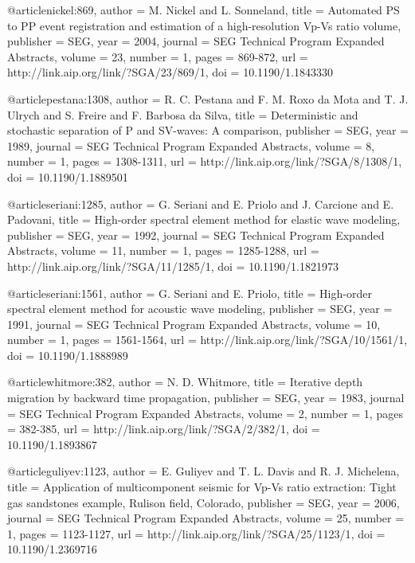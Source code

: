 @article{nickel:869,
  author =	 {M. Nickel and L. Sonneland},
  title =	 {Automated {PS} to {PP} event registration and
                  estimation of a high-resolution {V}p-{V}s ratio
                  volume},
  publisher =	 {SEG},
  year =	 2004,
  journal =	 {SEG Technical Program Expanded Abstracts},
  volume =	 23,
  number =	 1,
  pages =	 {869-872},
  url =		 {http://link.aip.org/link/?SGA/23/869/1},
  doi =		 {10.1190/1.1843330}
}

@article{pestana:1308,
  author =	 {R. C. Pestana and F. M. Roxo da Mota and
                  T. J. Ulrych and S. Freire and F. Barbosa
                  da Silva},
  title =	 {Deterministic and stochastic separation of {P} and
                  {SV}-waves: A comparison},
  publisher =	 {SEG},
  year =	 1989,
  journal =	 {SEG Technical Program Expanded Abstracts},
  volume =	 8,
  number =	 1,
  pages =	 {1308-1311},
  url =		 {http://link.aip.org/link/?SGA/8/1308/1},
  doi =		 {10.1190/1.1889501}
}

@article{seriani:1285,
  author =	 {G. Seriani and E. Priolo and J. Carcione and
                  E. Padovani},
  title =	 {High-order spectral element method for elastic wave
                  modeling},
  publisher =	 {SEG},
  year =	 1992,
  journal =	 {SEG Technical Program Expanded Abstracts},
  volume =	 11,
  number =	 1,
  pages =	 {1285-1288},
  url =		 {http://link.aip.org/link/?SGA/11/1285/1},
  doi =		 {10.1190/1.1821973}
}

@article{seriani:1561,
  author =	 {G. Seriani and E. Priolo},
  title =	 {High-order spectral element method for acoustic wave
                  modeling},
  publisher =	 {SEG},
  year =	 1991,
  journal =	 {SEG Technical Program Expanded Abstracts},
  volume =	 10,
  number =	 1,
  pages =	 {1561-1564},
  url =		 {http://link.aip.org/link/?SGA/10/1561/1},
  doi =		 {10.1190/1.1888989}
}

@article{whitmore:382,
  author =	 {N. D. Whitmore},
  title =	 {Iterative depth migration by backward time
                  propagation},
  publisher =	 {SEG},
  year =	 1983,
  journal =	 {SEG Technical Program Expanded Abstracts},
  volume =	 2,
  number =	 1,
  pages =	 {382-385},
  url =		 {http://link.aip.org/link/?SGA/2/382/1},
  doi =		 {10.1190/1.1893867}
}

@article{guliyev:1123,
  author =	 {E. Guliyev and T. L. Davis and R.
                  J. Michelena},
  title =	 {Application of multicomponent seismic for Vp-Vs
                  ratio extraction: Tight gas sandstones example,
                  Rulison field, Colorado},
  publisher =	 {SEG},
  year =	 2006,
  journal =	 {SEG Technical Program Expanded Abstracts},
  volume =	 25,
  number =	 1,
  pages =	 {1123-1127},
  url =		 {http://link.aip.org/link/?SGA/25/1123/1},
  doi =		 {10.1190/1.2369716}
}


